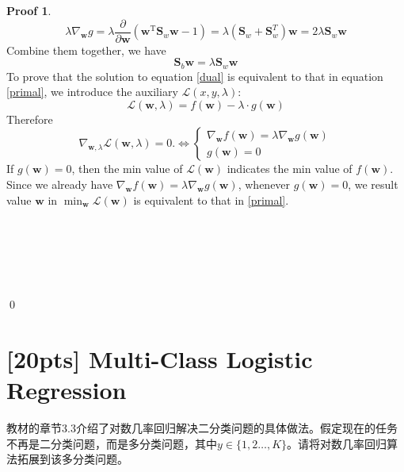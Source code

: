 \documentclass[a4paper,UTF8]{article}
\numberwithin{equation}{section}
\theoremstyle{definition}
\newtheorem*{prove}{Proof}
\begin{document}
\begin{prove}
 \begin{equation}
 \lambda \nabla_{ \mathbf{w}} g = \lambda \frac{ \partial}{\partial\mathbf{w} }  (  \mathbf{w}^\mathrm{T} \mathbf{S}_w\mathbf{w} - 1) =\lambda (\mathbf{S}_w+ \mathbf{S}_w^T) \mathbf{w} = 2  \lambda\mathbf{S}_w \mathbf{w}
 \end{equation}
Combine them together, we have 
  \begin{equation}
  \mathbf{S}_b\mathbf{w} = \lambda \mathbf{S}_w\mathbf{w}
   \end{equation}
To prove that  the solution to equation \eqref{dual} is equivalent to that in equation \eqref{primal},  we  introduce the auxiliary $\mathcal{L}(x,y,\lambda)$: 
 \begin{equation} 
\mathcal{L}(\mathbf{w},\lambda) = f(\mathbf{w}) - \lambda \cdot g(\mathbf{w})
 \end{equation}
Therefore
  \begin{equation} 
 \nabla_{\mathbf{w}, \lambda} \mathcal{L}(\mathbf{w}, \lambda)=0.\iff
 \begin{cases}
\nabla_{\mathbf{w}} f(\mathbf{w}) = \lambda \nabla_{\mathbf{w}} g(\mathbf{w})\\
 g(\mathbf{w}) = 0
\end{cases}
 \end{equation}
 If  $g(\mathbf{w}) = 0$, then the min value of $ \mathcal{L}(\mathbf{w})$ indicates the min value of $f(\mathbf{w})$. 
Since we already have $\nabla_{\mathbf{w}} f(\mathbf{w}) = \lambda \nabla_{\mathbf{w}} g(\mathbf{w})$, whenever $g(\mathbf{w}) = 0$, we result value $\mathbf{w}$ in $\min_{\mathbf{w}}\mathcal{L}(\mathbf{w}) $ is equivalent to that in \eqref{primal}.
 


~\\
~\\
~\\
~\\
~\\
\qed
\end{prove}

\section{[20pts] Multi-Class Logistic Regression}
教材的章节3.3介绍了对数几率回归解决二分类问题的具体做法。假定现在的任务不再是二分类问题，而是多分类问题，其中$y\in\{1,2\dots,K\}$。请将对数几率回归算法拓展到该多分类问题。
\end{document}
